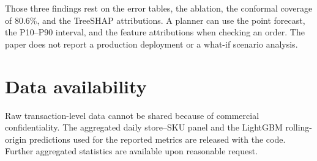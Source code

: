 \documentclass[review,authoryear]{elsarticle}
\begin{document}
Those three findings rest on the error tables, the ablation, the conformal coverage of 80.6\%, and the TreeSHAP attributions. A planner can use the point forecast, the P10--P90 interval, and the feature attributions when checking an order. The paper does not report a production deployment or a what-if scenario analysis.

\section*{Data availability}

Raw transaction-level data cannot be shared because of commercial confidentiality. The aggregated daily store--SKU panel and the LightGBM rolling-origin predictions used for the reported metrics are released with the code. Further aggregated statistics are available upon reasonable request.
\end{document}
